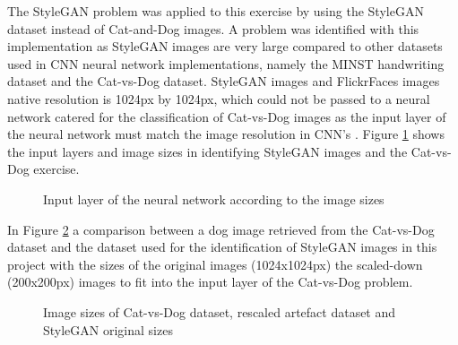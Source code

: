 The StyleGAN problem was applied to this exercise by using the StyleGAN dataset instead of Cat-and-Dog images. A problem was identified with this implementation as StyleGAN images are very large compared to other datasets used in CNN neural network implementations, namely the MINST handwriting dataset and the Cat-vs-Dog dataset. StyleGAN images and FlickrFaces images native resolution is 1024px by 1024px, which could not be passed to a neural network catered for the classification of Cat-vs-Dog images as the input layer of the neural network must match the image resolution in CNN's \citep{cat2014, Wang}. Figure \ref{fig:13} shows the input layers and image sizes in identifying StyleGAN images and the Cat-vs-Dog exercise.

\begin{figure}[H]%
\centering
{}%
\caption{Input layer of the neural network according to the image sizes}%
\label{fig:13}%
\end{figure}

In Figure \ref{fig:12} a comparison between a dog image retrieved from the Cat-vs-Dog dataset and the dataset used for the identification of StyleGAN images in this project with the sizes of the original images (1024x1024px) the scaled-down (200x200px) images to fit into the input layer of the Cat-vs-Dog problem. 

\begin{figure}[H]%
\centering
{}%
\caption{Image sizes of Cat-vs-Dog dataset, rescaled artefact dataset and StyleGAN original sizes}%
\label{fig:12}%
\end{figure}

